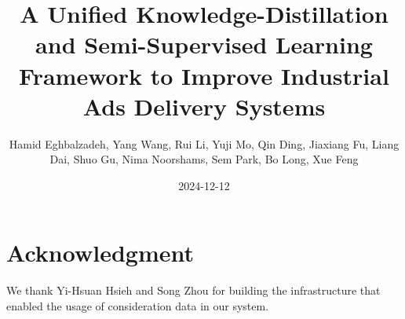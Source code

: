 \documentclass[]{fairmeta}
\title{A Unified Knowledge-Distillation and Semi-Supervised Learning Framework to Improve Industrial Ads Delivery Systems}
\author[1]{Hamid Eghbalzadeh, Yang Wang, Rui Li, Yuji Mo, Qin Ding, Jiaxiang Fu, Liang Dai, Shuo Gu, Nima Noorshams, Sem Park, Bo Long, Xue Feng}
\affiliation[1]{AI at Meta}
\date{2024-12-12}
\begin{document}
\maketitle








 



\section*{Acknowledgment}
We thank Yi-Hsuan Hsieh and Song Zhou for building the infrastructure that enabled the usage of consideration data in our system. 


\clearpage
\newpage



\clearpage
\end{document}

